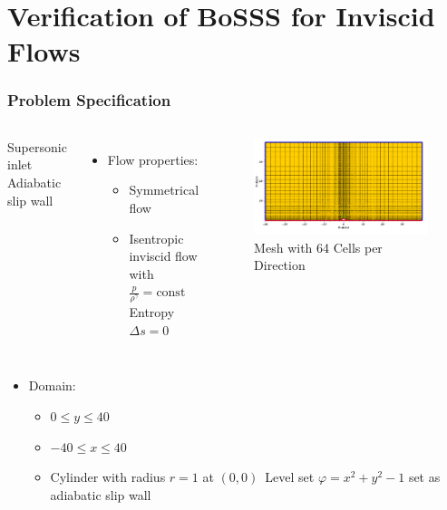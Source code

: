\section{Verification of BoSSS for Inviscid Flows}
\frame{\tableofcontents[currentsection]}
\begin{frame}
	\frametitle{Problem Specification}
	
			\begin{columns}[t]
				\column[]{4cm}
				\vspace{-0.5cm}
				\begin{itemize}
					\bluedot Supersonic inlet
					\reddot Adiabatic slip wall
				\end{itemize}
				\begin{itemize}
					\item Flow properties:
					\begin{itemize}
						\item Symmetrical flow
					 	\item Isentropic inviscid flow with $\tfrac{p}{\rho^\gamma}=\text{const}$ \newline \MVRightarrow \, Entropy $\Delta s = 0$				
					\end{itemize}
				\end{itemize}
				\column[]{8cm}
				\begin{figure}[htbp]
					\vspace{-1cm}
					\includegraphics[width=\textwidth]{img/inviscid2.PNG}
					\vspace{-0.3cm}
					\caption{Mesh with 64 Cells per Direction}
				\end{figure} 
			\end{columns}
				\vspace{-0.8cm}
				\begin{itemize}
						\item Domain:
					\begin{itemize}
						\item $0 \leq y \leq 40$
						\item $-40 \leq x \leq 40$
						\item Cylinder with radius $r=1$ at $(0,0)$\newline \MVRightarrow \, Level set $\varphi  = x^2 + y^2 -1$ set as \color{myred} adiabatic slip wall\color{black}			
					\end{itemize}
				\end{itemize}

\end{frame}
